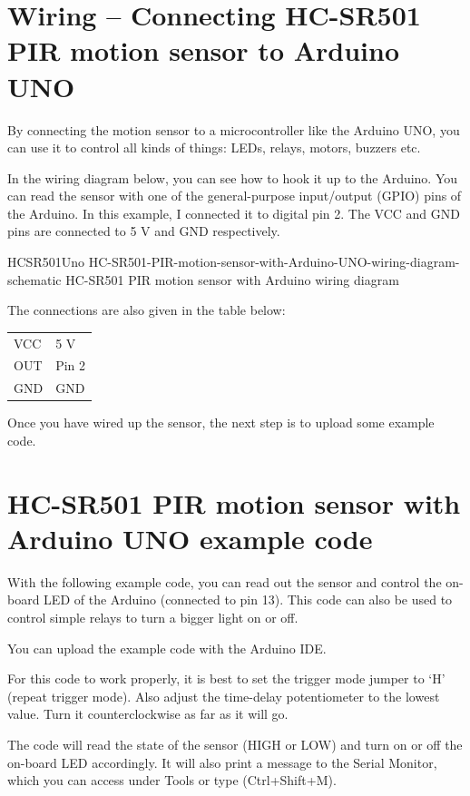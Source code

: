 \section{Wiring – Connecting HC-SR501 PIR motion sensor to Arduino UNO}

By connecting the motion sensor to a microcontroller like the Arduino UNO, you can use it to control all kinds of things: LEDs, relays, motors, buzzers etc.

In the wiring diagram below, you can see how to hook it up to the Arduino. You can read the sensor with one of the general-purpose input/output (GPIO) pins of the Arduino. In this example, I connected it to digital pin 2. The VCC and GND pins are connected to 5 V and GND respectively.

HCSR501Uno
HC-SR501-PIR-motion-sensor-with-Arduino-UNO-wiring-diagram-schematic
HC-SR501 PIR motion sensor with Arduino wiring diagram


The connections are also given in the table below:


\begin{center}
  \begin{tabular}{ll}
    VCC  & 5 V\\
    OUT  & Pin 2\\
    GND  & GND\\
  \end{tabular}	
\end{center}


Once you have wired up the sensor, the next step is to upload some example code.

\section{HC-SR501 PIR motion sensor with Arduino UNO example code}

With the following example code, you can read out the sensor and control the on-board LED of the Arduino (connected to pin 13). This code can also be used to control simple relays to turn a bigger light on or off.

You can upload the example code with the Arduino IDE.

For this code to work properly, it is best to set the trigger mode jumper to ‘H’ (repeat trigger mode). Also adjust the time-delay potentiometer to the lowest value. Turn it counterclockwise as far as it will go.

The code will read the state of the sensor (HIGH or LOW) and turn on or off the on-board LED accordingly. It will also print a message to the Serial Monitor, which you can access under Tools or type (Ctrl+Shift+M).




